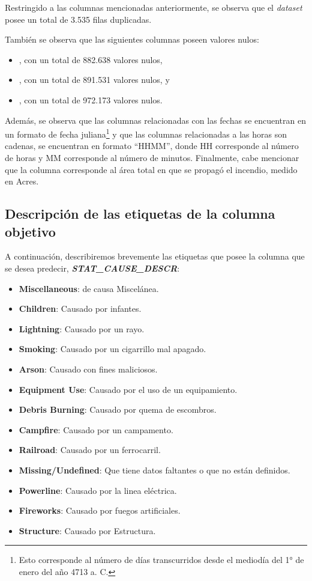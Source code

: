 Restringido a las columnas mencionadas anteriormente, se observa que el \textit{dataset} posee un total de 3.535 filas duplicadas. 

También se observa que las siguientes columnas poseen valores nulos: 
\begin{itemize}
    \item {}, con un total de 882.638 valores nulos,
    \item {}, con un total de 891.531 valores nulos, y
    \item {}, con un total de 972.173 valores nulos.
\end{itemize}

Además, se observa que las columnas relacionadas con las fechas se encuentran en un formato de fecha juliana\footnote{Esto corresponde al número de días transcurridos desde el mediodía del 1° de enero del año 4713 a. C.} y que las columnas relacionadas a las horas son cadenas, se encuentran en formato ``HHMM'', donde HH corresponde al número de horas y MM corresponde al número de minutos. Finalmente, cabe mencionar que la columna  corresponde al área total en que se propagó el incendio, medido en Acres.

\subsection{Descripción de las etiquetas de la columna objetivo}

A continuación, describiremos brevemente las etiquetas que posee la columna que se desea predecir, \textit{\textbf{STAT\_CAUSE\_DESCR}}:
\begin{itemize}
    \item \textbf{Miscellaneous}: de causa Miscelánea.
    \item \textbf{Children}: Causado por infantes.
    \item \textbf{Lightning}: Causado por un rayo.
    \item \textbf{Smoking}: Causado por un cigarrillo mal apagado.
    \item \textbf{Arson}: Causado con fines maliciosos.
    \item \textbf{Equipment Use}: Causado por el uso de un equipamiento.
    \item \textbf{Debris Burning}: Causado por quema de escombros.
    \item \textbf{Campfire}: Causado por un campamento.
    \item \textbf{Railroad}: Causado por un ferrocarril.
    \item \textbf{Missing/Undefined}: Que tiene datos faltantes o que no están definidos.
    \item \textbf{Powerline}: Causado por la linea eléctrica.
    \item \textbf{Fireworks}: Causado por fuegos artificiales.
    \item \textbf{Structure}: Causado por Estructura.
\end{itemize}


